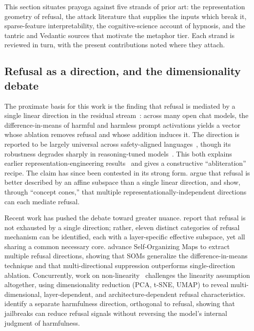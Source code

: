 This section situates prayoga against five strands of prior art: the
representation geometry of refusal, the attack literature that supplies the inputs
which break it, sparse-feature interpretability, the cognitive-science account of
hypnosis, and the tantric and Vedantic sources that motivate the metaphor tier.
Each strand is reviewed in turn, with the present contributions noted where they
attach.

\subsection{Refusal as a direction, and the dimensionality debate}
The proximate basis for this work is the finding that refusal is mediated by a
single linear direction in the residual stream~\cite{arditi2024refusal}: across
many open chat models, the difference-in-means of harmful and harmless prompt
activations yields a vector whose ablation removes refusal and whose addition
induces it. The direction is reported to be largely universal across safety-aligned
languages~\cite{wang2025multilingual}, though its robustness degrades sharply in
reasoning-tuned models~\cite{yin2025refusal}. This both explains earlier representation-engineering
results~\cite{zou2023representation} and gives a constructive ``abliteration''
recipe. The claim has since been contested in its strong form.
\citet{marshall2024refusal} argue that refusal is better described by an affine
subspace than a single linear direction, and \citet{wollschlager2025geometry}
show, through ``concept cones,'' that multiple representationally-independent
directions can each mediate refusal.

Recent work has pushed the debate toward greater nuance. \citet{johnson2026more}
report that refusal is not exhausted by a single direction; rather, eleven distinct
categories of refusal mechanism can be identified, each with a layer-specific
effective subspace, yet all sharing a common necessary core. \citet{piras2025som}
advance Self-Organizing Maps to extract multiple refusal directions, showing that
SOMs generalize the difference-in-means technique and that multi-directional
suppression outperforms single-direction ablation. Concurrently, work on
non-linearity~\cite{hildebrandt2025refusal} challenges the linearity assumption
altogether, using dimensionality reduction (PCA, t-SNE, UMAP) to reveal
multi-dimensional, layer-dependent, and architecture-dependent refusal
characteristics. \citet{zhao2025harmfulness} identify a separate harmfulness
direction, orthogonal to refusal, showing that jailbreaks can reduce refusal signals
without reversing the model's internal judgment of harmfulness.

